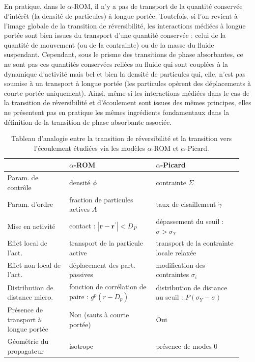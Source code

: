 \subparagraph{}En pratique, dans le $\alpha$-ROM, il n'y a pas de transport de la quantité conservée d'intérêt (la densité de particules) à longue portée. Toutefois, si l'on revient à l'image globale de la transition de réversibilité, les interactions médiées à longue portée sont bien issues du transport d'une quantité conservée : celui de la quantité de mouvement (ou de la contrainte) ou de la masse du fluide suspendant. Cependant, sous le prisme des transitions de phase absorbantes, ce ne sont pas ces quantités conservées reliées au fluide qui sont couplées à la dynamique d'activité mais bel et bien la densité de particules qui, elle, n'est pas soumise à un transport à longue portée (les particules opèrent des déplacements à courte portée uniquement). Ainsi, même si les interactions médiées dans le cas de la transition de réversibilité et d'écoulement sont issues des mêmes principes, elles ne présentent pas en pratique les mêmes ingrédients fondamentaux dans la définition de la transition de phase absorbante associée.

\begingroup

\setlength{\tabcolsep}{10pt}
\renewcommand{\arraystretch}{1.5}

\begin{table}[h]
\centering
\begin{tabular}{P{0.25\linewidth}P{0.35\linewidth}P{0.35\linewidth}}
\hline \hline  & $\alpha$-ROM & $\alpha$-Picard \\
\hline
Param. de contrôle  & densité $\phi$ & contrainte $\Sigma$ \\
Param. d'ordre & fraction de particules actives $A$ & taux de cisaillement $\dot{\gamma}$ \\
Mise en activité & contact : $|\mathbf{r}-\mathbf{r}^\prime| < D_P$ & dépassement du seuil : $\sigma > \sigma_Y$\\
Effet local de l'act. & transport de la particule active & transport de la contrainte locale relaxée \\
Effet non-local de l'act. & déplacement des part. passives & modification des contraintes $\sigma_i$ \\
Distribution de distance micro.  & fonction de corrélation de paire : $g^p(r-D_p)$ & distribution de distance au seuil : $P(\sigma_Y - \sigma)$\\
\hline 
Présence de transport à longue portée & Non (sauts à courte portée) & Oui \\
Géométrie du propagateur & isotrope & présence de modes 0 \\
\hline \hline
\end{tabular}
\caption{Tableau d'analogie entre la transition de réversibilité et la transition vers l'écoulement étudiées via les modèles $\alpha$-ROM et $\alpha$-Picard.}
\label{tab:analogie}
\end{table}

